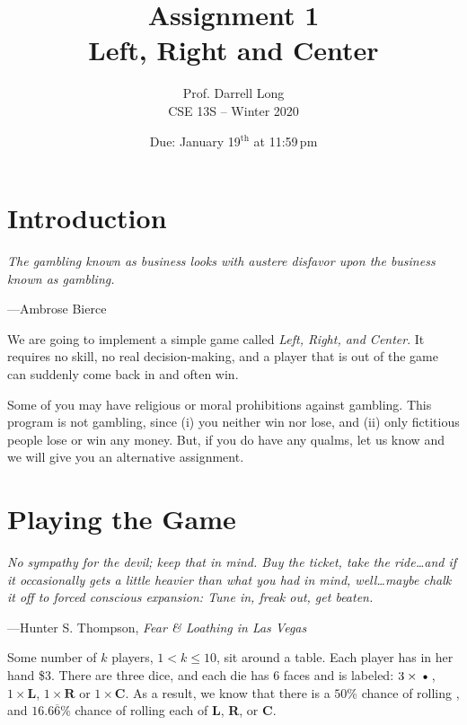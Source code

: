 \documentclass{article}
\title{Assignment 1 \\ Left, Right and Center}
\author{Prof. Darrell Long \\
CSE 13S -- Winter 2020}
\date{Due: January 19$^\text{th}$ at 11:59\,pm}
\begin{document}
\maketitle


\section{Introduction}
\textwidth
\epigraph{\emph{The gambling known as business looks with austere disfavor
upon the business known as gambling.}}{---Ambrose Bierce}

\noindent We are going to implement a simple game called \emph{Left, Right, and Center}.
It requires no skill, no real decision-making, and a player that is out of the
game can suddenly come back in and often win.

Some of you may have religious or moral prohibitions against gambling. This
program is not gambling, since (i) you neither win nor lose, and (ii) only
fictitious people lose or win any money. But, if you do have any qualms, let
us know and we will give you an alternative assignment.

\section{Playing the Game}
\textwidth
\epigraph{\emph{No sympathy for the devil; keep that in mind. Buy
the ticket, take the ride\ldots and if it occasionally gets a little
heavier than what you had in mind, well\ldots maybe chalk it off
to forced conscious expansion: Tune in, freak out, get beaten.}}{---Hunter
S. Thompson, \emph{Fear \& Loathing in Las Vegas}}

Some number of $k$ players, $1 < k \le 10$, sit around a table.
Each player has in her hand \$3. There are three dice, and each die
has $6$ faces and is labeled: $3 \times \textbf{\textbullet}$, $1
\times \textbf{L}$, $1 \times \textbf{R}$ or $1 \times \textbf{C}$.
As a result, we know that there is a $50$\% chance of rolling
\textbf{\textbullet}, and $16.6\overline{6}$\% chance of rolling
each of \textbf{L}, \textbf{R}, or \textbf{C}.
\end{document}
